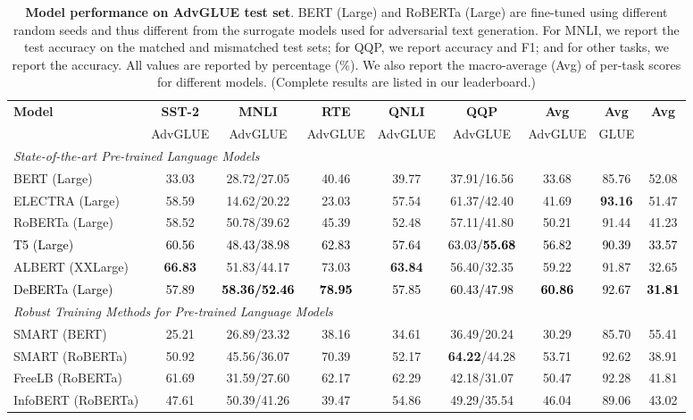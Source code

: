 \documentclass{article}
\newcommand{\method}{AdvGLUE\xspace}
\newcommand{\m}[1]{{\textcolor{black}{{#1}}}}
\begin{document}
\begin{table}[t]
\small
    \centering
    \caption{\small \textbf{Model performance on \method test set}. BERT (Large) and RoBERTa (Large) are fine-tuned using different random seeds and thus different from the surrogate models used for adversarial text generation. 
    For MNLI, we report the test accuracy on the matched  and mismatched test sets; for QQP, we report accuracy and F1; and for other tasks, we report the accuracy. All values are reported by percentage (\%). We also report the macro-average (Avg) of per-task scores for different models. (Complete results are listed in our leaderboard.)}
    \label{tab:benchmark}
\setlength{\tabcolsep}{3.75pt}
    \begin{tabular}{l|ccccc|ccc}
    \toprule
    \multirow{2}{*}{\textbf{Model}} & \multirow{1}{*}{\textbf{SST-2}} &  \multirow{1}{*}{\textbf{MNLI}} &  \multirow{1}{*}{\textbf{RTE}} &  \multirow{1}{*}{\textbf{QNLI}} &   \multirow{1}{*}{\textbf{QQP}} & \textbf{Avg} & \textbf{Avg} & \textbf{Avg}   \\
         & \scriptsize{AdvGLUE} & \scriptsize{AdvGLUE} & \scriptsize{AdvGLUE} & \scriptsize{AdvGLUE} & \scriptsize{AdvGLUE} & \scriptsize{AdvGLUE} & \scriptsize{GLUE} & \scriptsize{}  \\
    \midrule 
    \multicolumn{8}{l}{\emph{State-of-the-art Pre-trained Language Models}} \\
    \midrule
    {BERT (Large)} & 33.03 & 28.72/27.05 & 40.46 & 39.77 & 37.91/16.56 & 33.68 & 85.76  & 52.08 \\
    {ELECTRA (Large)} & 58.59 & 14.62/20.22 & 23.03 & 57.54 & 61.37/42.40  & 41.69 & \textbf{93.16} & 51.47 \\
    {RoBERTa (Large)} & 58.52 & 50.78/39.62 & 45.39 & 52.48 & 57.11/41.80  & 50.21 & 91.44 & 41.23 \\
    \m{{T5 (Large)}} & \m{60.56} & \m{48.43/38.98} & \m{62.83} & \m{57.64} & \m{63.03/\textbf{55.68}} & \m{56.82} & \m{90.39} & \m{33.57} \\
    {ALBERT (XXLarge)} & \textbf{66.83} & 51.83/44.17 & 73.03 & \textbf{63.84} & 56.40/32.35  & 59.22 & 91.87 & 32.65 \\
    \m{{DeBERTa (Large)}} & \m{57.89} & \m{\textbf{58.36/52.46}} & \m{\textbf{78.95}} & \m{57.85} & \m{60.43/47.98} & \m{\textbf{60.86}} & \m{92.67} & \m{\textbf{31.81}} \\
\midrule 
    \multicolumn{8}{l}{\emph{Robust Training Methods for Pre-trained Language Models}} \\
    \midrule 
    {SMART (BERT)} & 25.21 & 26.89/23.32 & 38.16 & 34.61 & 36.49/20.24  & 30.29 & 85.70 & 55.41\\
    {SMART (RoBERTa)} & 50.92 & 45.56/36.07 & 70.39 & 52.17 & \textbf{64.22}/44.28  & 53.71 & 92.62 & 38.91 \\
    {FreeLB (RoBERTa)} & 61.69 & 31.59/27.60 & 62.17 & 62.29 & 42.18/31.07  & 50.47 & 92.28 & 41.81 \\
    {InfoBERT (RoBERTa)} & 47.61 & 50.39/41.26 & 39.47 & 54.86 & 49.29/35.54  & 46.04 & 89.06 & 43.02 \\
    \bottomrule
    \end{tabular}
\end{table}
\end{document}
